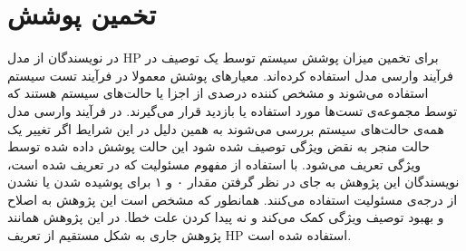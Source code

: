 \section{تخمین پوشش}
در
\cite{Chockler_Halpern_Kupferman_2008}
نویسندگان از مدل
HP
برای تخمین میزان پوشش
سیستم توسط یک توصیف در فرآیند وارسی مدل استفاده کرده‌اند.
معیارهای پوشش معمولا در فرآیند تست سیستم استفاده می‌شوند و مشخص کننده‌ درصدی از اجزا یا حالت‌های سیستم هستند که توسط مجموعه‌ی تست‌ها مورد استفاده یا بازدید قرار می‌گیرند.
در فرآیند وارسی مدل همه‌ی حالت‌های سیستم بررسی می‌شوند به همین دلیل در این شرایط اگر تغییر یک حالت منجر به نقض ویژگی توصیف شده شود این حالت پوشش داده شده توسط ویژگی تعریف می‌شود.
با استفاده از مفهوم مسئولیت
که در
\cite{hp2}
تعریف شده است، نویسندگان این پژوهش به جای در نظر گرفتن مقدار ۰ و ۱ برای پوشیده شدن یا نشدن از درجه‌ی مسئولیت استفاده می‌کنند.
همانطور که مشخص است این پژوهش به اصلاح و بهبود توصیف ویژگی کمک می‌کند و نه پیدا کردن علت خطا.
در این پژوهش همانند پژوهش جاری به شکل مستقیم از تعریف 
HP
استفاده شده است.